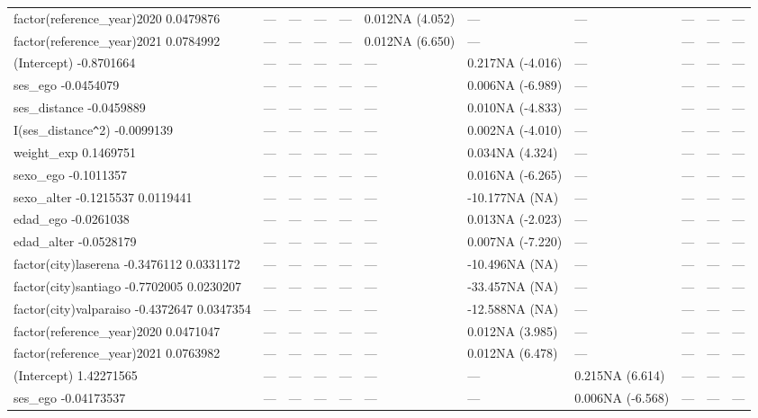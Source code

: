 \begin{table}[ht]
\begin{tabular}{lllllllllll}
  factor(reference\_year)2020 0.0479876 & --- & --- & --- & --- & 0.012NA (4.052) & --- & --- & --- & --- & --- \\ 
  factor(reference\_year)2021 0.0784992 & --- & --- & --- & --- & 0.012NA (6.650) & --- & --- & --- & --- & --- \\ 
  (Intercept) -0.8701664 & --- & --- & --- & --- & --- & 0.217NA (-4.016) & --- & --- & --- & --- \\ 
  ses\_ego -0.0454079 & --- & --- & --- & --- & --- & 0.006NA (-6.989) & --- & --- & --- & --- \\ 
  ses\_distance -0.0459889 & --- & --- & --- & --- & --- & 0.010NA (-4.833) & --- & --- & --- & --- \\ 
  I(ses\_distance\verb|^|2) -0.0099139 & --- & --- & --- & --- & --- & 0.002NA (-4.010) & --- & --- & --- & --- \\ 
  weight\_exp 0.1469751 & --- & --- & --- & --- & --- & 0.034NA (4.324) & --- & --- & --- & --- \\ 
  sexo\_ego -0.1011357 & --- & --- & --- & --- & --- & 0.016NA (-6.265) & --- & --- & --- & --- \\ 
  sexo\_alter -0.1215537 0.0119441 & --- & --- & --- & --- & --- & -10.177NA (NA) & --- & --- & --- & --- \\ 
  edad\_ego -0.0261038 & --- & --- & --- & --- & --- & 0.013NA (-2.023) & --- & --- & --- & --- \\ 
  edad\_alter -0.0528179 & --- & --- & --- & --- & --- & 0.007NA (-7.220) & --- & --- & --- & --- \\ 
  factor(city)laserena -0.3476112 0.0331172 & --- & --- & --- & --- & --- & -10.496NA (NA) & --- & --- & --- & --- \\ 
  factor(city)santiago -0.7702005 0.0230207 & --- & --- & --- & --- & --- & -33.457NA (NA) & --- & --- & --- & --- \\ 
  factor(city)valparaiso -0.4372647 0.0347354 & --- & --- & --- & --- & --- & -12.588NA (NA) & --- & --- & --- & --- \\ 
  factor(reference\_year)2020 0.0471047 & --- & --- & --- & --- & --- & 0.012NA (3.985) & --- & --- & --- & --- \\ 
  factor(reference\_year)2021 0.0763982 & --- & --- & --- & --- & --- & 0.012NA (6.478) & --- & --- & --- & --- \\ 
  (Intercept) 1.42271565 & --- & --- & --- & --- & --- & --- & 0.215NA (6.614) & --- & --- & --- \\ 
  ses\_ego -0.04173537 & --- & --- & --- & --- & --- & --- & 0.006NA (-6.568) & --- & --- & --- \\ 

\end{tabular}
\end{table}

